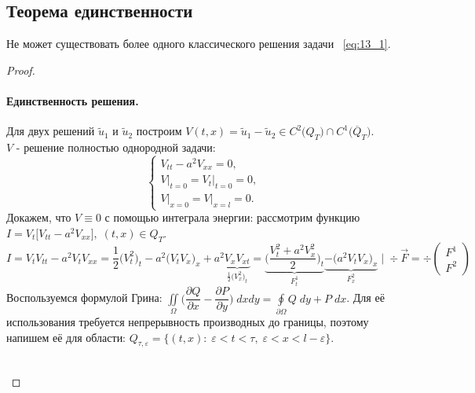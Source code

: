 \subsection{Теорема единственности}
\begin{theorem}[Единственности]
Не может существовать более одного классического решения задачи ~\ref{eq:13_1}.
\end{theorem}
\begin{proof}
\paragraph{Единственность решения.}
Для двух решений $\tilde{u}_{1}$ и $\tilde{u}_{2}$  построим $V(t, x) = \tilde{u}_{1} - \tilde{u}_{2} \in C^{2}\bigl(Q_{T}\bigr) \cap C^{1}\bigl(\overline{Q}_{T}\bigr)$.\\$V$ - решение полностью однородной задачи:
\begin{equation*}
\begin{cases}
V_{tt} - a^2V_{xx} = 0, \\
V\bigr|_{t = 0} = V_t\bigr|_{t = 0} = 0, \\
V\bigr|_{x = 0} = V\bigr|_{x = l} = 0.
\end{cases}
\end{equation*}
Докажем, что $V \equiv 0$ с помощью интеграла энергии: рассмотрим функцию $I = V_{t}\bigl[V_{tt} - a^2V_{xx}\bigr],\; (t, x) \in Q_{T}$.
\begin{equation*}
I = V_{t}V_{tt} - a^2V_{t}V_{xx} = \dfrac{1}{2}\bigl(V_{t}^{2}\bigr)_{t} - a^2\bigl(V_{t}V_{x}
\bigr)_{x} + a^2\underbrace{V_{x}V_{xt}}_{\frac{1}{2} \bigl(V_{x}^{2}\bigr)_{t}} = \underbrace{\biggl(\dfrac{V_{t}^2 + a^2V_{x}^{2}}{2}\biggr)_{t}}_{F^1_t}  \underbrace{ - \bigl(a^{2}V_{t}V_{x}\bigr)_{x}}_{F_{x}^{2}}\; \biggr|\; \div\vec{F} = \div \begin{pmatrix}
F^1 \\
F^2
\end{pmatrix}
\end{equation*}
Воспользуемся формулой Грина: $\iint\limits_{\Omega}\bigl(\dfrac{\partial Q}{\partial x} - \dfrac{\partial P}{\partial y}\bigr)\;dxdy = \oint\limits_{\partial \Omega}Q\;dy + P\;dx$.
Для её использования требуется непрерывность производных до границы, поэтому напишем её для области: $Q_{\tau, \varepsilon} = \{(t, x)\colon\; \varepsilon < t < \tau,\; \varepsilon < x < l - \varepsilon\}$.\\
\ \\
\begin{minipage}[c]{0.2\textwidth}
\begin{center}
\end{center}
\end{minipage}
\end{proof}
